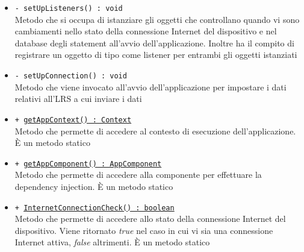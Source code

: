 \documentclass[../Tesi.tex]{subfiles}
\begin{document}
\begin{description}
\begin{itemize}
				\item \texttt{- setUpListeners() : void}\\
				Metodo che si occupa di istanziare gli oggetti che controllano quando vi sono cambiamenti nello stato della connessione Internet del dispositivo e nel database degli statement all'avvio dell'applicazione. Inoltre ha il compito di registrare un oggetto di tipo  come listener per entrambi gli oggetti istanziati

				\item \texttt{- setUpConnection() : void}\\
				Metodo che viene invocato all'avvio dell'applicazione per impostare i dati relativi all'LRS a cui inviare i dati

				\item \texttt{+ \underline{getAppContext() : Context}}\\
				Metodo che permette di accedere al contesto di esecuzione dell'applicazione. È un metodo statico

				\item \texttt{+ \underline{getAppComponent() : AppComponent}}\\
				Metodo che permette di accedere alla componente per effettuare la dependency injection. È un metodo statico

				\item \texttt{+ \underline{InternetConnectionCheck() : boolean}}\\
				Metodo che permette di accedere allo stato della connessione Internet del dispositivo. Viene ritornato \textit{true} nel caso in cui vi sia una connessione Internet attiva, \textit{false} altrimenti. È un metodo statico
			\end{itemize}
		\end{description}
\end{document}
